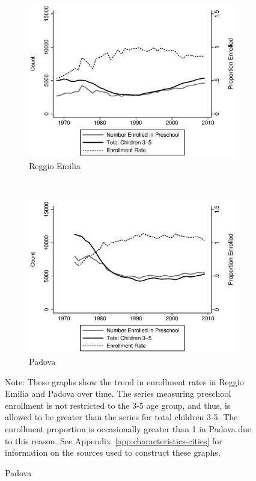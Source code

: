 \begin{figure}[H]
\caption{Preschool Enrollment Rates Over Time}
\label{fig:preschool-enroll}
\begin{center}
\begin{subfigure}[b]{0.55\textwidth}
	\caption{Reggio Emilia}\label{fig:enrollmentRateReggio}
	\includegraphics[width=\textwidth]{../../output/image/enrollment_vs_totalChildren_Reggio.eps}
\end{subfigure}%
~
\begin{subfigure}[b]{0.55\textwidth}
	\caption{Padova}\label{fig:enrollmentRatePadova}
	\includegraphics[width=\textwidth]{../../output/image/enrollment_vs_totalChildren_Padova.eps}
\end{subfigure}%
\end{center}
\raggedright \footnotesize Note: These graphs show the trend in enrollment rates in Reggio Emilia and Padova over time. The series measuring preschool enrollment is not restricted to the 3-5 age group, and thus, is allowed to be greater than the series for total children 3-5. The enrollment proportion is occasionally greater than 1 in Padova due to this reason. See Appendix~\ref{app:characteristics-cities} for information on the sources used to construct these graphs.
\end{figure}

